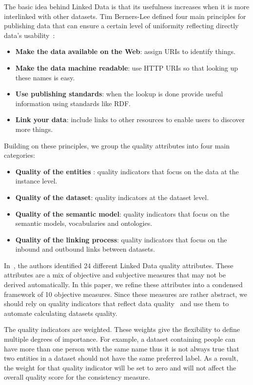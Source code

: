 \documentclass[a4paper,11pt,twoside]{ThesisStyle}
\begin{document}
The basic idea behind Linked Data is that its usefulness increases when it is more interlinked with other datasets. Tim Berners-Lee defined four main principles for publishing data that can ensure a certain level of uniformity reflecting directly data's usability~\cite{Berners-Lee:W3C:06}:

\begin{itemize}
	\item \textbf{Make the data available on the Web}: assign URIs to identify things.
	\item \textbf{Make the data machine readable}: use HTTP URIs so that looking up these names is easy.
	\item \textbf{Use publishing standards}: when the lookup is done provide useful information using standards like RDF.
	\item \textbf{Link your data}: include links to other resources to enable users to discover more things.
\end{itemize}

\noindent
Building on these principles, we group the quality attributes into four main categories:

\begin{itemize}
	\item \textbf{Quality of the entities }: quality indicators that focus on the data at the instance level.
	\item \textbf{Quality of the dataset}: quality indicators at the dataset level.
	\item \textbf{Quality of the semantic model}: quality indicators that focus on the semantic models, vocabularies and ontologies.
	\item \textbf{Quality of the linking process}: quality indicators that focus on the inbound and outbound links between datasets.
\end{itemize}

In~\cite{Assaf:DQMST:12}, the authors identified 24 different Linked Data quality attributes. These attributes are a mix of objective and subjective measures that may not be derived automatically. In this paper, we refine these attributes into a condensed framework of 10 objective measures. Since these measures are rather abstract, we should rely on quality indicators that reflect data quality~\cite{Flemming:Thesis:10} and use them to automate calculating datasets quality.

The quality indicators are weighted. These weights give the flexibility to define multiple degrees of importance. For example, a dataset containing people can have more than one person with the same name thus it is not always true that two entities in a dataset should not have the same preferred label. As a result, the weight for that quality indicator will be set to zero and will not affect the overall quality score for the consistency measure.
\end{document}
